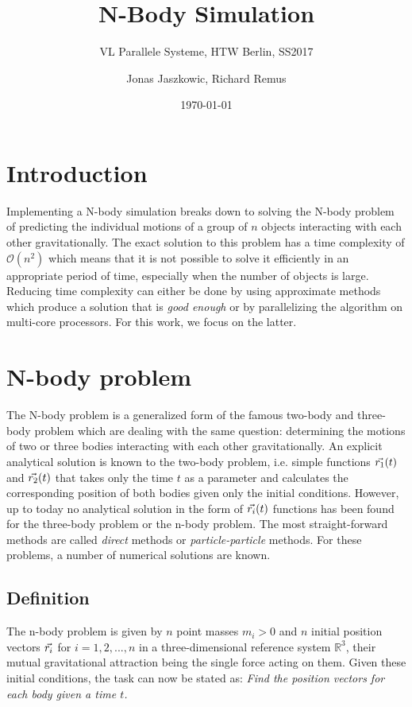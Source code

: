 \documentclass[a4paper,11pt]{scrartcl} %
\title{N-Body Simulation}
\subtitle{VL Parallele Systeme, HTW Berlin, SS2017}
\author{Jonas Jaszkowic, Richard Remus}
\date{\today}
\newcommand*{\vv}[1]{\vec{\mkern0mu#1}}
\begin{document}
\maketitle
\tableofcontents

\section{Introduction}
Implementing a N-body simulation breaks down to solving the N-body problem of predicting the individual motions of a group of $n$ objects interacting with each other gravitationally. The exact solution to this problem has a time complexity of $\mathcal{O}(n^2)$ which means that it is not possible to solve it efficiently in an appropriate period of time, especially when the number of objects is large. Reducing time complexity can either be done by using approximate methods which produce a solution that is \emph{good enough} or by parallelizing the algorithm on multi-core processors. For this work, we focus on the latter.

\section{N-body problem}
The N-body problem is a generalized form of the famous two-body and three-body problem which are dealing with the same question: determining the motions of two or three bodies interacting with each other gravitationally. An explicit analytical solution is known to the two-body problem, i.e. simple functions $\vv{r_1}(t)$ and $\vv{r_2}(t)$ that takes only the time $t$ as a parameter and calculates the corresponding position of both bodies given only the initial conditions. However, up to today no analytical solution in the form of $\vv{r_i}(t)$ functions has been found for the three-body problem or the n-body problem. \cite{nbodysolve} The most straight-forward methods are called \textit{direct} methods or \textit{particle-particle} methods. For these problems, a number of numerical solutions are known.
\subsection{Definition}
The n-body problem is given by $n$ point masses $m_i > 0$ and $n$ initial position vectors $\vv{r_i}$ for $i=1,2,...,n$ in a three-dimensional reference system $\mathbb{R}^3$, their mutual gravitational attraction being the single force acting on them. \cite{meyer2008introduction}Given these initial conditions, the task can now be stated as: \textit{Find the position vectors for each body given a time $t$.}
\end{document}
